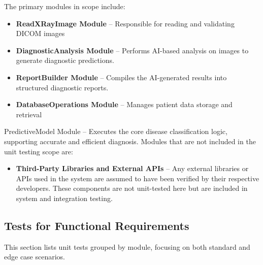 \documentclass[12pt, titlepage]{article}
\begin{document}
The primary modules in scope include:
\begin{itemize}
  \item \textbf{ReadXRayImage Module} – Responsible for reading and validating DICOM images
  \item \textbf{DiagnosticAnalysis Module} – Performs AI-based analysis on images to generate diagnostic predictions.
  \item \textbf{ReportBuilder Module} – Compiles the AI-generated results into structured diagnostic reports.
  \item \textbf{DatabaseOperations Module} – Manages patient data storage and retrieval
\end{itemize}

PredictiveModel  Module – Executes the core disease classification logic, supporting accurate and efficient diagnosis.
Modules that are not included in the unit testing scope are:
\begin{itemize}
  \item \textbf{Third-Party Libraries and External APIs} – Any external libraries or APIs used in the system are assumed to have been verified by their respective developers. These components are not unit-tested here but are included in system and integration testing.
\end{itemize}

\subsection{Tests for Functional Requirements}
This section lists unit tests grouped by module, focusing on both standard and edge case scenarios.
\end{document}
